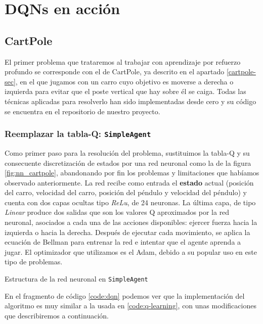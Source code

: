 \chapter{DQNs en acción}
\label{cap:dqnEnAccion}


\section{CartPole}
\label{sec:cartpoleDQN}

El primer problema que trataremos al trabajar con aprendizaje por refuerzo profundo se corresponde con el de CartPole, ya descrito en el apartado \ref{cartpole-sec}, en el que jugamos con un carro cuyo objetivo es moverse a derecha o izquierda para evitar que el poste vertical que hay sobre él se caiga. Todas las técnicas aplicadas para resolverlo han sido implementadas desde cero y su código se encuentra en el repositorio de nuestro proyecto.


\subsection{Reemplazar la tabla-Q: \texttt{SimpleAgent}}

Como primer paso para la resolución del problema, sustituimos la tabla-Q y su consecuente discretización de estados por una red neuronal como la de la figura \ref{fig:nn_cartpole}, abandonando por fin los problemas y limitaciones que habíamos observado anteriormente. La red recibe como entrada el \textbf{estado} actual (posición del carro, velocidad del carro, posición del péndulo y velocidad del péndulo) y cuenta con dos capas ocultas tipo \textit{ReLu}, de 24 neuronas. La última capa, de tipo \textit{Linear} produce dos salidas que son los valores Q aproximados por la red neuronal, asociados a cada una de las acciones disponibles: ejercer fuerza hacia la izquierda o hacia la derecha. Después de ejecutar cada movimiento, se aplica la ecuación de Bellman para entrenar la red e intentar que el agente aprenda a jugar. El optimizador que utilizamos es el Adam, debido a su popular uso en este tipo de problemas.

%
       {Estructura de la red neuronal en \texttt{SimpleAgent}}

En el fragmento de código \ref{code:dqn} podemos ver que la implementación del algoritmo es muy similar a la usada en \ref{code:q-learning}, con unas modificaciones que describiremos a continuación.


